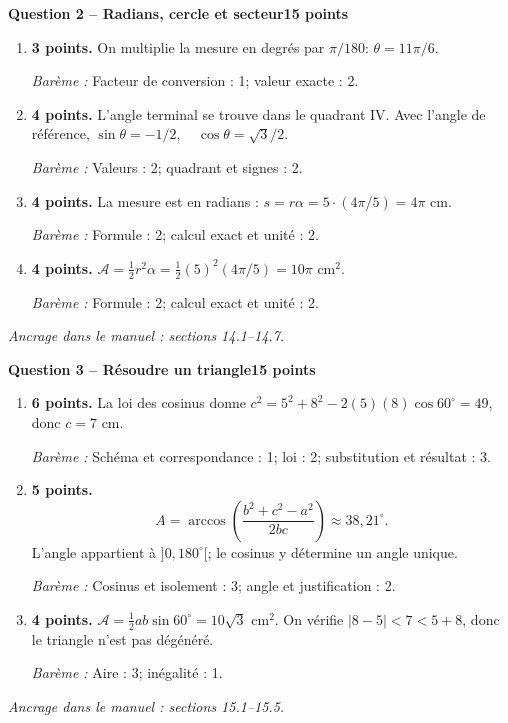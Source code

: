 \documentclass[11pt,a4paper]{article}
\begin{document}
\newpage
{\large\bfseries Question 2 -- Radians, cercle et secteur}\hfill\textbf{15 points}\par
\begin{enumerate}
\item \textbf{3 points.} On multiplie la mesure en degrés par \(\pi/180\): \(\theta=11\pi/6\).
\par{\small\textit{Barème : }Facteur de conversion : 1; valeur exacte : 2.}
\item \textbf{4 points.} L’angle terminal se trouve dans le quadrant IV. Avec l’angle de référence, \(\sin\theta=-1/2,\quad\cos\theta=\sqrt3/2\).
\par{\small\textit{Barème : }Valeurs : 2; quadrant et signes : 2.}
\item \textbf{4 points.} La mesure est en radians : \(s=r\alpha=5\cdot(4\pi/5)=4\pi\) cm.
\par{\small\textit{Barème : }Formule : 2; calcul exact et unité : 2.}
\item \textbf{4 points.} \(\mathcal A=\frac12r^2\alpha=\frac12(5)^2(4\pi/5)=10\pi\) cm\(^2\).
\par{\small\textit{Barème : }Formule : 2; calcul exact et unité : 2.}
\end{enumerate}
\vfill {\small\textit{Ancrage dans le manuel : sections 14.1--14.7.}}

\newpage
{\large\bfseries Question 3 -- Résoudre un triangle}\hfill\textbf{15 points}\par
\begin{enumerate}
\item \textbf{6 points.} La loi des cosinus donne \(c^2=5^2+8^2-2(5)(8)\cos60^\circ=49\), donc \(c=7\) cm.
\par{\small\textit{Barème : }Schéma et correspondance : 1; loi : 2; substitution et résultat : 3.}
\item \textbf{5 points.} \[A=\arccos\!\left(\frac{b^2+c^2-a^2}{2bc}\right)\approx 38{,}21^\circ.\] L’angle appartient à \(]0,180^\circ[\); le cosinus y détermine un angle unique.
\par{\small\textit{Barème : }Cosinus et isolement : 3; angle et justification : 2.}
\item \textbf{4 points.} \(\mathcal A=\frac12 ab\sin60^\circ=10\sqrt3\) cm\(^2\). On vérifie \(|8-5|<7<5+8\), donc le triangle n’est pas dégénéré.
\par{\small\textit{Barème : }Aire : 3; inégalité : 1.}
\end{enumerate}
\vfill {\small\textit{Ancrage dans le manuel : sections 15.1--15.5.}}
\end{document}
